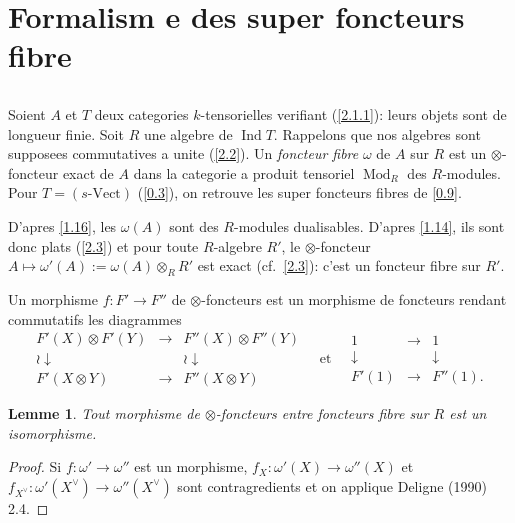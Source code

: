 \documentclass[11pt,a4paper]{article}
\theoremstyle{plain}
\newtheorem{lemma}[theorem]{Lemme}
\theoremstyle{definition}
\DeclareMathOperator{\Ind}{Ind}
\newcommand{\Vect}{\mathrm{Vect}}
\newcommand{\Mod}{\operatorname{Mod}}
\begin{document}
\section{Formalism e des super foncteurs fibre}\label{3}

\subsection{}\label{3.1}

Soient $A$ et $T$ deux categories $k$-tensorielles verifiant (\ref{2.1.1}): leurs objets sont de longueur finie. Soit $R$ une algebre de $\Ind T$. Rappelons que nos algebres sont supposees commutatives a unite (\ref{2.2}). Un \emph{foncteur fibre} $\omega$ de $A$ sur $R$ est un $\otimes$-foncteur exact de $A$ dans la categorie a produit tensoriel $\Mod_R$ des $R$-modules. Pour $T=(s\text{-}\Vect)$ (\ref{0.3}), on retrouve les super foncteurs fibres de \ref{0.9}.

D'apres \ref{1.16}, les $\omega(A)$ sont des $R$-modules dualisables. D'apres \ref{1.14}, ils sont donc plats (\ref{2.3}) et pour toute $R$-algebre $R'$, le $\otimes$-foncteur $A\mapsto\omega'(A):=\omega(A)\otimes_R R'$ est exact (cf.~\ref{2.3}): c'est un foncteur fibre sur $R'$.

Un morphisme $f:F'\to F''$ de $\otimes$-foncteurs est un morphisme de foncteurs rendant commutatifs les diagrammes
\[
\begin{matrix}
F'(X)\otimes F'(Y) & \longrightarrow & F''(X)\otimes F''(Y)\\
\wr\downarrow & & \wr\downarrow\\
F'(X\otimes Y) & \longrightarrow & F''(X\otimes Y)
\end{matrix}
\quad\text{et}\quad
\begin{matrix}
1 & \longrightarrow & 1\\
\downarrow & & \downarrow\\
F'(1) & \longrightarrow & F''(1).
\end{matrix}
\]

\begin{lemma}\label{3.2}
Tout morphisme de $\otimes$-foncteurs entre foncteurs fibre sur $R$ est un isomorphisme.
\end{lemma}

\begin{proof}
Si $f:\omega'\to\omega''$ est un morphisme, $f_X:\omega'(X)\to\omega''(X)$ et $f_{X^\vee}:\omega'(X^\vee)\to\omega''(X^\vee)$ sont contragredients et on applique Deligne (1990) 2.4.
\end{proof}
\end{document}
